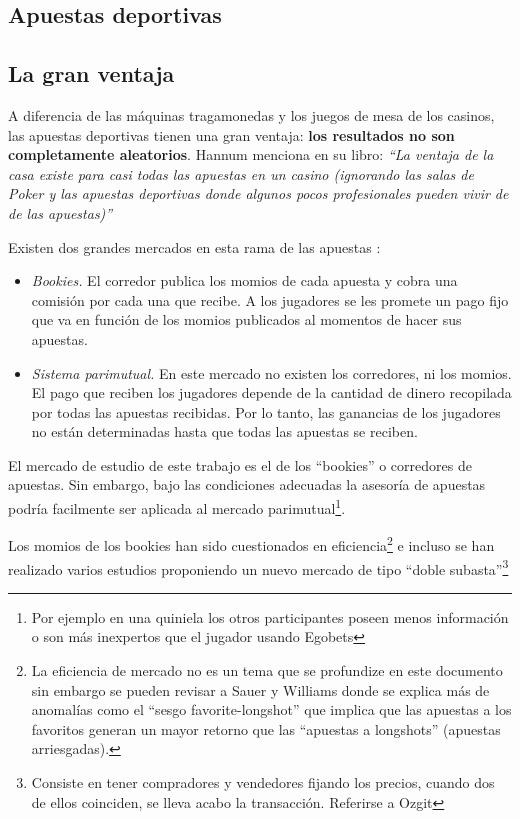 \subsection{Apuestas deportivas}

\subsection{La gran ventaja}

A diferencia de las máquinas tragamonedas y los juegos de mesa de los casinos, las apuestas deportivas tienen una gran ventaja: \textbf{los resultados no son completamente aleatorios}. Hannum menciona en su libro: \emph{``La ventaja de la casa existe para casi todas las apuestas en un casino (ignorando las salas de Poker y las apuestas deportivas donde algunos pocos profesionales pueden vivir de de las apuestas)''} \cite{hannum2005practical} 

Existen dos grandes mercados en esta rama de las apuestas \cite{chung2010empirical}:
\begin{itemize} 
	\item \emph{Bookies.} El corredor publica los momios de cada apuesta y cobra una comisión por cada una que recibe. A los jugadores se les promete un pago fijo que va en función de los momios publicados al momentos de hacer sus apuestas.
	\item \emph{Sistema parimutual.} En este mercado no existen los corredores, ni los momios. El pago que reciben los jugadores depende de la cantidad de dinero recopilada por todas las apuestas recibidas. Por lo tanto, las ganancias de los jugadores no están determinadas hasta que todas las apuestas se reciben.
	\end{itemize}

El mercado de estudio de este trabajo es el de los ``bookies'' o corredores de apuestas. Sin embargo, bajo las condiciones adecuadas la asesoría de apuestas podría facilmente ser aplicada al mercado parimutual\footnote{Por ejemplo en una quiniela los otros participantes poseen menos información o son más inexpertos que el jugador usando Egobets}.

Los momios de los bookies han sido cuestionados en eficiencia\footnote{La eficiencia de mercado no es un tema que se profundize en este documento sin embargo se pueden revisar a Sauer \cite{sauer1998economics} y Williams \cite{williams1999information} donde se explica más de anomalías como el ``sesgo favorite-longshot'' que implica que las apuestas a los favoritos generan un mayor retorno que las ``apuestas a longshots'' (apuestas arriesgadas).  } e incluso se han realizado varios estudios proponiendo un nuevo mercado de tipo ``doble subasta''\footnote{Consiste en tener compradores y vendedores fijando los precios, cuando dos de ellos coinciden, se lleva acabo la transacción. Referirse a Ozgit\cite{ozgit2005posted} }

